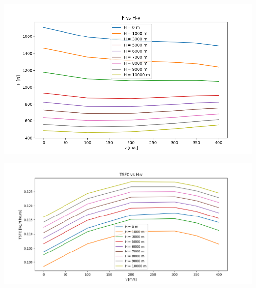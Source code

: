 \documentclass[titlepage]{article}
\begin{document}
\begin{center}
    \includegraphics[width=\textwidth]{FHV.png}
\end{center}
  
  \begin{center}
    \includegraphics[width=\textwidth]{TSFCHV.png}
  \end{center}

  

  
\end{document}
